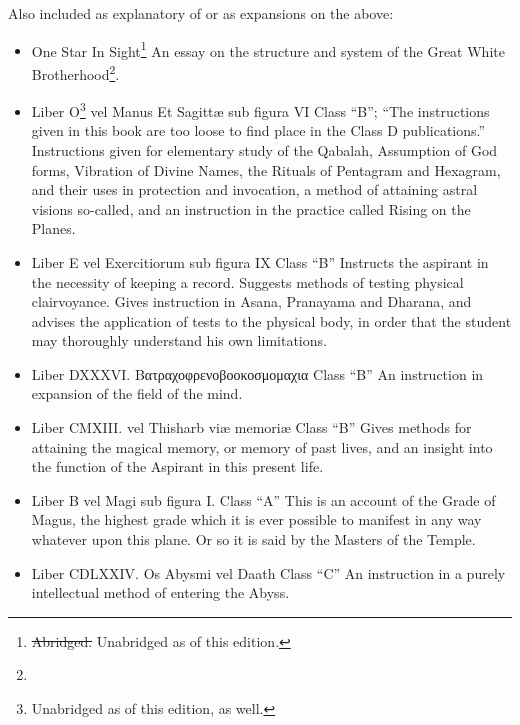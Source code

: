 \begin{samepage}
Also included as explanatory of or as expansions on the above: \begin{itemize}
\item One Star In Sight\footnote{\sout{Abridged.} Unabridged as of this edition.} \textemdash{} An essay on the structure and system of the Great White Brotherhood\footnote{\Argentium{}}.
\item Liber O\footnote{Unabridged as of this edition, as well.} vel Manus Et Sagitt\ae{} sub figura VI \textemdash{} Class \enquote{B}; \enquote{The instructions given in this book are too loose to find place in the Class D publications.} \textemdash{} Instructions given for elementary study of the Qabalah, Assumption of God forms, Vibration of Divine Names, the Rituals of Pentagram and Hexagram, and their uses in protection and invocation, a method of attaining astral visions so-called, and an instruction in the practice called Rising on the Planes.
\item Liber E vel Exercitiorum sub figura IX \textemdash{} Class \enquote{B} \textemdash{} Instructs the aspirant in the necessity of keeping a record. Suggests methods of testing physical clairvoyance. Gives instruction in Asana, Pranayama and Dharana, and advises the application of tests to the physical body, in order that the student may thoroughly understand his own limitations.
\item Liber DXXXVI. \textgreek{Βατραχοφρενοβοοκοσμομαχια} \textemdash{} Class \enquote{B} \textemdash{} An instruction in expansion of the field of the mind.
\item Liber CMXIII.  vel Thisharb vi\ae{}{} memori\ae{}{} \textemdash{} Class \enquote{B} \textemdash{} Gives methods for attaining the magical memory, or memory of past lives, and an insight into the function of the Aspirant in this present life.
\item Liber B vel Magi sub figura I. \textemdash{} Class \enquote{A} \textemdash{} This is an account of the Grade of Magus, the highest grade which it is ever possible to manifest in any way whatever upon this plane. Or so it is said by the Masters of the Temple.
\item Liber CDLXXIV. Os Abysmi vel Daath \textemdash{} Class \enquote{C} \textemdash{} An instruction in a purely intellectual method of entering the Abyss.
\end{itemize}
\end{samepage}

